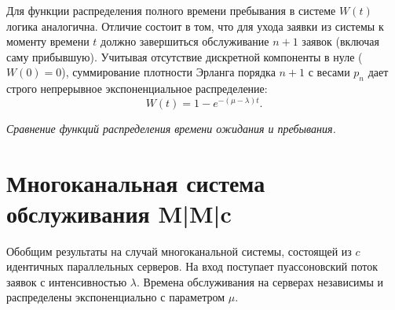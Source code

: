 \begin{sproof}
Для функции распределения полного времени пребывания в системе $W(t)$ логика аналогична. Отличие состоит в том, что для ухода заявки из системы к моменту времени $t$ должно завершиться обслуживание $n+1$ заявок (включая саму прибывшую). Учитывая отсутствие дискретной компоненты в нуле ($W(0) = 0$), суммирование плотности Эрланга порядка $n+1$ с весами $p_n$ дает строго непрерывное экспоненциальное распределение:
$$
W(t) = 1 - e^{-(\mu - \lambda)t}.
$$
\end{sproof}

\begin{center}
    \pgfplotsset{compat=1.9}
    
    \vspace{2mm}
    \small\textit{Сравнение функций распределения времени ожидания и пребывания.}
\end{center}

\section{Многоканальная система обслуживания M|M|c}

Обобщим результаты на случай многоканальной системы, состоящей из $c$ идентичных параллельных серверов. На вход поступает пуассоновский поток заявок с интенсивностью $\lambda$. Времена обслуживания на серверах независимы и распределены экспоненциально с параметром $\mu$. 

